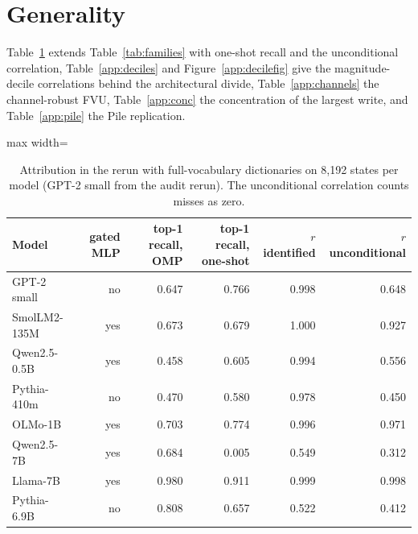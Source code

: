 \section{Generality}\label{app:general}
Table~\ref{app:attribmodels} extends Table~\ref{tab:families} with one-shot recall and the unconditional correlation, Table~\ref{app:deciles} and Figure~\ref{app:decilefig} give the magnitude-decile correlations behind the architectural divide, Table~\ref{app:channels} the channel-robust FVU, Table~\ref{app:conc} the concentration of the largest write, and Table~\ref{app:pile} the Pile replication.
\begin{table}[H]\centering\small
\caption{Attribution in the rerun with full-vocabulary dictionaries on 8{,}192 states per model (GPT-2 small from the audit rerun). The unconditional correlation counts misses as zero.}\label{app:attribmodels}
\begin{adjustbox}{max width=\linewidth}
\begin{tabular}{lrrrrr}\toprule
Model & gated MLP & top-1 recall, OMP & top-1 recall, one-shot & $r$ identified & $r$ unconditional \\ \midrule
GPT-2 small & no & 0.647 & 0.766 & 0.998 & 0.648 \\
SmolLM2-135M & yes & 0.673 & 0.679 & 1.000 & 0.927 \\
Qwen2.5-0.5B & yes & 0.458 & 0.605 & 0.994 & 0.556 \\
Pythia-410m & no & 0.470 & 0.580 & 0.978 & 0.450 \\
OLMo-1B & yes & 0.703 & 0.774 & 0.996 & 0.971 \\
Qwen2.5-7B & yes & 0.684 & 0.005 & 0.549 & 0.312 \\
Llama-7B & yes & 0.980 & 0.911 & 0.999 & 0.998 \\
Pythia-6.9B & no & 0.808 & 0.657 & 0.522 & 0.412 \\
\bottomrule\end{tabular}\end{adjustbox}
\end{table}
